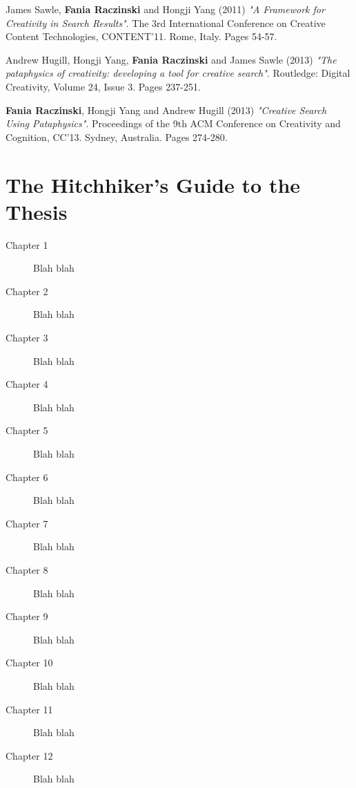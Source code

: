 James Sawle, \textbf{Fania Raczinski} and Hongji Yang (2011) \emph{"A Framework for Creativity in Search Results"}. The 3rd International Conference on Creative Content Technologies, CONTENT'11. Rome, Italy. Pages 54-57.

\noindent Andrew Hugill, Hongji Yang, \textbf{Fania Raczinski} and James Sawle (2013) \emph{"The pataphysics of creativity: developing a tool for creative search"}. Routledge: Digital Creativity, Volume 24, Issue 3. Pages 237-251.

\noindent \textbf{Fania Raczinski}, Hongji Yang and Andrew Hugill (2013) \emph{"Creative Search Using Pataphysics"}. Proceedings of the 9th ACM Conference on Creativity and Cognition, CC'13. Sydney, Australia. Pages 274-280.

\section{The Hitchhiker's Guide to the Thesis}

\begin{description}
\item[Chapter 1] Blah blah
\item[Chapter 2] Blah blah
\item[Chapter 3] Blah blah
\item[Chapter 4] Blah blah
\item[Chapter 5] Blah blah
\item[Chapter 6] Blah blah
\item[Chapter 7] Blah blah
\item[Chapter 8] Blah blah
\item[Chapter 9] Blah blah
\item[Chapter 10] Blah blah
\item[Chapter 11] Blah blah
\item[Chapter 12] Blah blah
\end{description}
